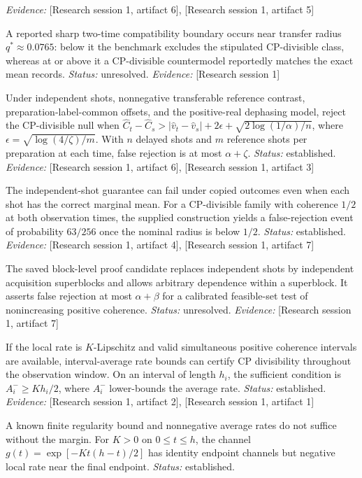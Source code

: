 \documentclass[11pt]{article}
\begin{document}
\begin{sloppypar}
\begin{description}
\textit{Evidence: }[Research session 1, artifact 6], [Research session 1, artifact 5]
\item[C25] A reported sharp two-time compatibility boundary occurs near transfer radius $q^*\approx0.0765$: below it the benchmark excludes the stipulated CP-divisible class, whereas at or above it a CP-divisible countermodel reportedly matches the exact mean records. \textit{Status: }unresolved.
\textit{Evidence: }[Research session 1]
\item[C26] Under independent shots, nonnegative transferable reference contrast, preparation-label-common offsets, and the positive-real dephasing model, reject the CP-divisible null when $\widehat C_t-\widehat C_s>|\widehat v_t-\widehat v_s|+2\epsilon+\sqrt{2\log(1/\alpha)/n}$, where $\epsilon=\sqrt{\log(4/\zeta)/m}$. With $n$ delayed shots and $m$ reference shots per preparation at each time, false rejection is at most $\alpha+\zeta$. \textit{Status: }established.
\textit{Evidence: }[Research session 1, artifact 6], [Research session 1, artifact 3]
\item[C27] The independent-shot guarantee can fail under copied outcomes even when each shot has the correct marginal mean. For a CP-divisible family with coherence $1/2$ at both observation times, the supplied construction yields a false-rejection event of probability $63/256$ once the nominal radius is below $1/2$. \textit{Status: }established.
\textit{Evidence: }[Research session 1, artifact 4], [Research session 1, artifact 7]
\item[C28] The saved block-level proof candidate replaces independent shots by independent acquisition superblocks and allows arbitrary dependence within a superblock. It asserts false rejection at most $\alpha+\beta$ for a calibrated feasible-set test of nonincreasing positive coherence. \textit{Status: }unresolved.
\textit{Evidence: }[Research session 1, artifact 7]
\item[C29] If the local rate is $K$-Lipschitz and valid simultaneous positive coherence intervals are available, interval-average rate bounds can certify CP divisibility throughout the observation window. On an interval of length $h_i$, the sufficient condition is $A_i^-\geq Kh_i/2$, where $A_i^-$ lower-bounds the average rate. \textit{Status: }established.
\textit{Evidence: }[Research session 1, artifact 2], [Research session 1, artifact 1]
\item[C30] A known finite regularity bound and nonnegative average rates do not suffice without the margin. For $K>0$ on $0\leq t\leq h$, the channel $g(t)=\exp[-Kt(h-t)/2]$ has identity endpoint channels but negative local rate near the final endpoint. \textit{Status: }established.

\end{description}
\end{sloppypar}
\end{document}
